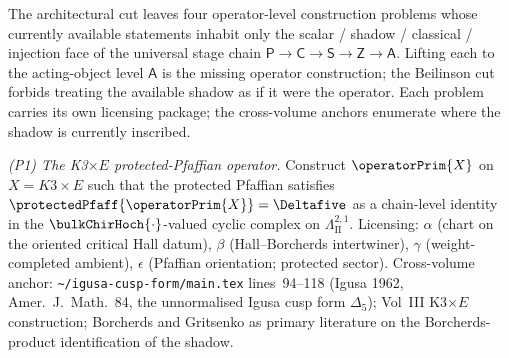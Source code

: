\begin{remark}
\label{rem:four-construction-problems}
\label{prop:four-construction-problems}%
%
%
The architectural cut leaves four operator-level
construction problems whose currently available statements
inhabit only the scalar / shadow / classical / injection face of
the universal stage chain
$\mathsf P\to\mathsf C\to\mathsf S\to\mathsf Z\to\mathsf A$.
Lifting each to the acting-object level $\mathsf A$ is the missing
operator construction; the Beilinson cut forbids treating the
available shadow as if it were the operator. Each problem carries its own
licensing package; the cross-volume anchors enumerate where the
shadow is currently inscribed.

\emph{(P1) The K3$\times E$ protected-Pfaffian operator.}
Construct $\operatorPrim{X}$ on $X = K3\times E$ such that the
protected Pfaffian satisfies $\protectedPfaff{\operatorPrim{X}} =
\Deltafive$ as a chain-level identity in the
$\bulkChirHoch{\cdot}$-valued cyclic complex on
$\Lambda^{2,1}_{\mathrm{II}}$. Licensing: $\alpha$ (chart on the
oriented critical Hall datum), $\beta$ (Hall--Borcherds
intertwiner), $\gamma$ (weight-completed ambient), $\epsilon$
(Pfaffian orientation; protected sector). Cross-volume anchor:
\texttt{\textasciitilde/igusa-cusp-form/main.tex} lines~94--118
(Igusa 1962, Amer.\ J.\ Math.\ 84, the unnormalised Igusa cusp
form $\Delta_5$); Vol~III K3$\times E$ construction; Borcherds
\cite{Borcherds1995} and Gritsenko \cite{Gritsenko1999} as
primary literature on the Borcherds-product identification of the
shadow.


\end{remark}
